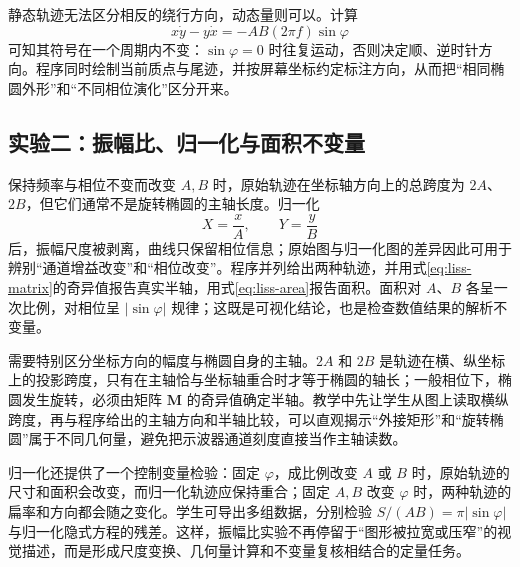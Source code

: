 \documentclass[UTF8,a4paper,zihao=-4]{ctexart}
\begin{document}
静态轨迹无法区分相反的绕行方向，动态量则可以。计算
\begin{equation}
 x\dot y-y\dot x=-AB(2\pi f)\sin\varphi
 \label{eq:liss-direction}
\end{equation}
可知其符号在一个周期内不变：$\sin\varphi=0$ 时往复运动，否则决定顺、逆时针方向。程序同时绘制当前质点与尾迹，并按屏幕坐标约定标注方向，从而把“相同椭圆外形”和“不同相位演化”区分开来。

\subsection{实验二：振幅比、归一化与面积不变量}
保持频率与相位不变而改变 $A,B$ 时，原始轨迹在坐标轴方向上的总跨度为 $2A$、$2B$，但它们通常不是旋转椭圆的主轴长度。归一化
\begin{equation}
  X=\frac{x}{A},\qquad Y=\frac{y}{B}
\end{equation}
后，振幅尺度被剥离，曲线只保留相位信息；原始图与归一化图的差异因此可用于辨别“通道增益改变”和“相位改变”。程序并列给出两种轨迹，并用式\eqref{eq:liss-matrix}的奇异值报告真实半轴，用式\eqref{eq:liss-area}报告面积。面积对 $A$、$B$ 各呈一次比例，对相位呈 $|\sin\varphi|$ 规律；这既是可视化结论，也是检查数值结果的解析不变量。

需要特别区分坐标方向的幅度与椭圆自身的主轴。$2A$ 和 $2B$ 是轨迹在横、纵坐标上的投影跨度，只有在主轴恰与坐标轴重合时才等于椭圆的轴长；一般相位下，椭圆发生旋转，必须由矩阵 $\boldsymbol M$ 的奇异值确定半轴。教学中先让学生从图上读取横纵跨度，再与程序给出的主轴方向和半轴比较，可以直观揭示“外接矩形”和“旋转椭圆”属于不同几何量，避免把示波器通道刻度直接当作主轴读数。

归一化还提供了一个控制变量检验：固定 $\varphi$，成比例改变 $A$ 或 $B$ 时，原始轨迹的尺寸和面积会改变，而归一化轨迹应保持重合；固定 $A,B$ 改变 $\varphi$ 时，两种轨迹的扁率和方向都会随之变化。学生可导出多组数据，分别检验 $S/(AB)=\pi|\sin\varphi|$ 与归一化隐式方程的残差。这样，振幅比实验不再停留于“图形被拉宽或压窄”的视觉描述，而是形成尺度变换、几何量计算和不变量复核相结合的定量任务。
\end{document}
